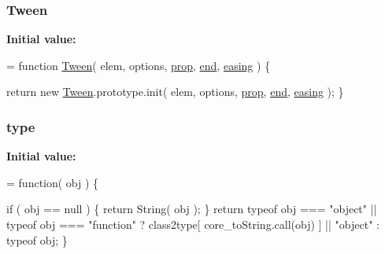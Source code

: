 \subsubsection[{Tween}]{ Tween}\label{jquery-1_810_82-vsdoc_8js_a91e55267cc469e865a6a7c6cfc51c7b1}
{\bfseries Initial value\+:}
\begin{DoxyCode}
= \textcolor{keyword}{function} \hyperlink{jquery-1_810_82-vsdoc_8js_a91e55267cc469e865a6a7c6cfc51c7b1}{Tween}( elem, options, \hyperlink{jquery-1_810_82-vsdoc_8js_af17be84954030af6c2286f5da385d41b}{prop}, \hyperlink{jquery-1_810_82-vsdoc_8js_af2ce7c86b4e6e9d61f85745258f4ef32}{end}, \hyperlink{jquery-1_810_82-vsdoc_8js_a9758a312629fa6de1744280dd6e6253b}{easing} ) \{

    \textcolor{keywordflow}{return} \textcolor{keyword}{new} \hyperlink{jquery-1_810_82-vsdoc_8js_a91e55267cc469e865a6a7c6cfc51c7b1}{Tween}.prototype.init( elem, options, \hyperlink{jquery-1_810_82-vsdoc_8js_af17be84954030af6c2286f5da385d41b}{prop}, \hyperlink{jquery-1_810_82-vsdoc_8js_af2ce7c86b4e6e9d61f85745258f4ef32}{end}, 
      \hyperlink{jquery-1_810_82-vsdoc_8js_a9758a312629fa6de1744280dd6e6253b}{easing} );
\}
\end{DoxyCode}
\hypertarget{jquery-1_810_82-vsdoc_8js_a3940565e83a9bfd10d95ffd27536da91}{}
\subsubsection[{type}]{ type}\label{jquery-1_810_82-vsdoc_8js_a3940565e83a9bfd10d95ffd27536da91}
{\bfseries Initial value\+:}
\begin{DoxyCode}
= \textcolor{keyword}{function}( obj ) \{


        \textcolor{keywordflow}{if} ( obj == null ) \{
            \textcolor{keywordflow}{return} String( obj );
        \}
        \textcolor{keywordflow}{return} typeof obj === \textcolor{stringliteral}{"object"} || typeof obj === \textcolor{stringliteral}{"function"} ?
            class2type[ core\_toString.call(obj) ] || \textcolor{stringliteral}{"object"} :
            typeof obj;
    \}
\end{DoxyCode}
\hypertarget{jquery-1_810_82-vsdoc_8js_af46ad9e68add9abd540e1b4f9da37b62}{}
